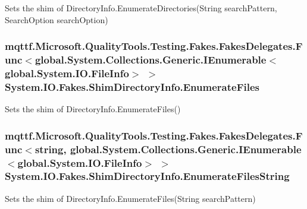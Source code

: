 Sets the shim of Directory\-Info.\-Enumerate\-Directories(\-String search\-Pattern, Search\-Option search\-Option)

\hypertarget{class_system_1_1_i_o_1_1_fakes_1_1_shim_directory_info_af56e4b841f720b8769a4cfc30fe3200e}{
\subsubsection[{Enumerate\-Files}]{\setlength{\rightskip}{0pt plus 5cm}mqttf.\-Microsoft.\-Quality\-Tools.\-Testing.\-Fakes.\-Fakes\-Delegates.\-Func$<$global.\-System.\-Collections.\-Generic.\-I\-Enumerable$<$global.\-System.\-I\-O.\-File\-Info$>$ $>$ System.\-I\-O.\-Fakes.\-Shim\-Directory\-Info.\-Enumerate\-Files\hspace{0.3cm}{\ttfamily [set]}}}\label{class_system_1_1_i_o_1_1_fakes_1_1_shim_directory_info_af56e4b841f720b8769a4cfc30fe3200e}


Sets the shim of Directory\-Info.\-Enumerate\-Files()

\hypertarget{class_system_1_1_i_o_1_1_fakes_1_1_shim_directory_info_a2838d351c5839cded70dd0d52ed29df5}{
\subsubsection[{Enumerate\-Files\-String}]{\setlength{\rightskip}{0pt plus 5cm}mqttf.\-Microsoft.\-Quality\-Tools.\-Testing.\-Fakes.\-Fakes\-Delegates.\-Func$<$string, global.\-System.\-Collections.\-Generic.\-I\-Enumerable$<$global.\-System.\-I\-O.\-File\-Info$>$ $>$ System.\-I\-O.\-Fakes.\-Shim\-Directory\-Info.\-Enumerate\-Files\-String\hspace{0.3cm}{\ttfamily [set]}}}\label{class_system_1_1_i_o_1_1_fakes_1_1_shim_directory_info_a2838d351c5839cded70dd0d52ed29df5}


Sets the shim of Directory\-Info.\-Enumerate\-Files(\-String search\-Pattern)

